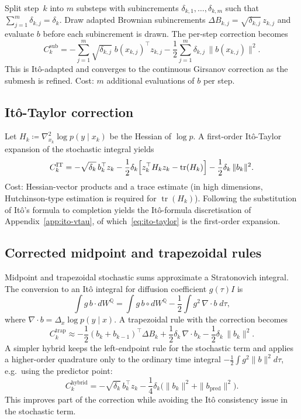 \documentclass[11pt]{article}
\newcommand{\bbQ}{\mathbb{Q}}
\begin{document}
Split step~$k$ into $m$ substeps with subincrements
$\delta_{k,1},\dots,\delta_{k,m}$ such that $\sum_{j=1}^{m}\delta_{k,j}=\delta_k$.
Draw adapted Brownian subincrements $\Delta B_{k,j}=\sqrt{\delta_{k,j}}\,z_{k,j}$
and evaluate $b$ before each subincrement is drawn.
The per-step correction becomes
\begin{equation}\label{eq:subdisc}
  C_k^{\text{sub}}
  =
  -\sum_{j=1}^{m} \sqrt{\delta_{k,j}}\; b(x_{k,j})^\top z_{k,j}
  -\frac12\sum_{j=1}^{m} \delta_{k,j}\,\|b(x_{k,j})\|^2.
\end{equation}
This is It\^o-adapted and converges to the continuous Girsanov correction as
the submesh is refined.
Cost: $m$ additional evaluations of $b$ per step.

\subsection{It\^o-Taylor correction}

Let $H_k \coloneqq \nabla^2_{x_k}\log p(y\mid x_k)$ be the Hessian of
$\log p$.
A first-order It\^o-Taylor expansion of the stochastic integral yields
\begin{equation}\label{eq:ito-taylor}
  C_k^{\text{IT}}
  =
  -\sqrt{\delta_k}\,b_k^\top z_k
  -\frac12\delta_k\Bigl[z_k^\top H_k z_k - \operatorname{tr}(H_k)\Bigr]
  -\frac12\delta_k\,\|b_k\|^2.
\end{equation}
Cost: Hessian-vector products and a trace estimate (in high dimensions,
Hutchinson-type estimation is required for $\operatorname{tr}(H_k)$).
Following the substitution of It\^o's formula to completion yields the
It\^o-formula discretisation of Appendix~\ref{app:ito-vtau},
of which~\eqref{eq:ito-taylor} is the first-order expansion.

\subsection{Corrected midpoint and trapezoidal rules}

Midpoint and trapezoidal stochastic sums approximate a Stratonovich integral.
The conversion to an It\^o integral for diffusion coefficient $g(\tau)I$ is
\[
\int g\,b\cdot dW^{\bbQ}
=
\int g\,b\circ dW^{\bbQ}
-\frac12\int g^2\,\nabla\!\cdot\! b\; d\tau,
\]
where $\nabla\!\cdot\! b = \Delta_x\log p(y\mid x)$.
A trapezoidal rule with the correction becomes
\[
C_k^{\text{trap}}
\approx
-\frac12(b_k+b_{k-1})^\top\Delta B_k
+\frac12\delta_k\,\nabla\!\cdot\! b_k
-\frac12\delta_k\,\|b_k\|^2.
\]
A simpler hybrid keeps the left-endpoint rule for the stochastic term and
applies a higher-order quadrature only to the ordinary time integral
$-\frac12\int g^2\|b\|^2 d\tau$, e.g.\ using the predictor point:
\[
C_k^{\text{hybrid}}
=
-\sqrt{\delta_k}\,b_k^\top z_k
-\frac14\delta_k\bigl(\|b_k\|^2+\|b_{\text{pred}}\|^2\bigr).
\]
This improves part of the correction while avoiding the It\^o consistency
issue in the stochastic term.
\end{document}
